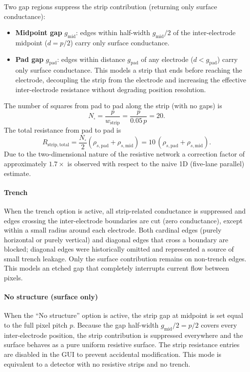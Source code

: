 \documentclass[preprint,numbers,1p]{elsarticle}
\begin{document}
Two gap regions suppress the strip contribution (returning only surface conductance):
\begin{itemize}
  \item \textbf{Midpoint gap} $g_\mathrm{mid}$: edges within half-width $g_\mathrm{mid}/2$ of
        the inter-electrode midpoint ($d = p/2$) carry only surface conductance.
  \item \textbf{Pad gap} $g_\mathrm{pad}$: edges within distance $g_\mathrm{pad}$ of any
        electrode ($d < g_\mathrm{pad}$) carry only surface conductance. This models a strip
        that ends before reaching the electrode, decoupling the strip from the electrode and
        increasing the effective inter-electrode resistance without degrading position resolution.
\end{itemize}

The number of squares from pad to pad along the strip (with no gaps) is
\begin{equation}
  N_\square = \frac{p}{w_\mathrm{strip}} = \frac{p}{0.05\,p} = 20.
\end{equation}
The total resistance from pad to pad is
\begin{equation}
  R_\mathrm{strip,total} = \frac{N_\square}{2}(\rho_{s,\mathrm{pad}} + \rho_{s,\mathrm{mid}})
  = 10\,(\rho_{s,\mathrm{pad}} + \rho_{s,\mathrm{mid}}).
\end{equation}
Due to the two-dimensional nature of the resistive network a correction factor of approximately
$1.7\times$ is observed with respect to the naive 1D (five-lane parallel) estimate.

\paragraph{Trench}
When the trench option is active, all strip-related conductance is suppressed and edges crossing
the inter-electrode boundaries are cut (zero conductance), except within a small radius around
each electrode. Both cardinal edges (purely horizontal or purely vertical) and diagonal edges
that cross a boundary are blocked; diagonal edges were historically omitted and represented a
source of small trench leakage. Only the surface contribution remains on non-trench edges. This
models an etched gap that completely interrupts current flow between pixels.

\paragraph{No structure (surface only)}
When the ``No structure'' option is active, the strip gap at midpoint is set equal to the full
pixel pitch $p$. Because the gap half-width $g_\mathrm{mid}/2 = p/2$ covers every inter-electrode
position, the strip contribution is suppressed everywhere and the surface behaves as a pure
uniform resistive surface. The strip resistance entries are disabled in the GUI to prevent
accidental modification. This mode is equivalent to a detector with no resistive strips and no
trench.
\end{document}
